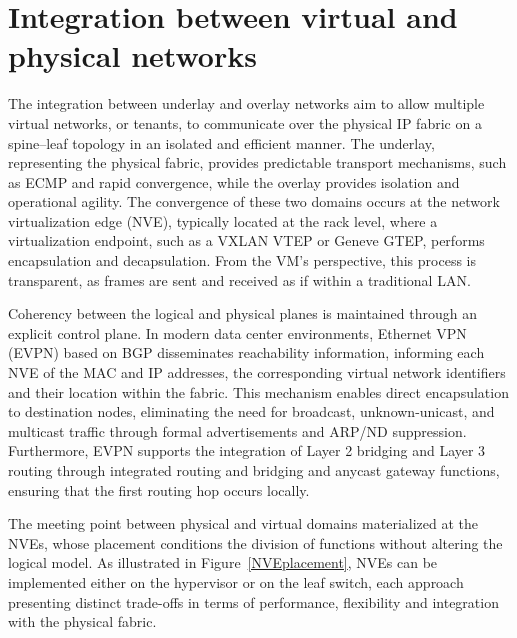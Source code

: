 \section{Integration between virtual and physical networks}

The integration between underlay and overlay networks aim to allow multiple virtual networks, or tenants, to communicate over the physical IP fabric on a spine–leaf topology in an isolated and efficient manner. The underlay, representing the physical fabric, provides predictable transport mechanisms, such as ECMP and rapid convergence, while the overlay provides isolation and operational agility. The convergence of these two domains occurs at the network virtualization edge (NVE), typically located at the rack level, where a virtualization endpoint, such as a VXLAN VTEP or Geneve GTEP, performs encapsulation and decapsulation. From the VM's perspective, this process is transparent, as frames are sent and received as if within a traditional LAN.

Coherency between the logical and physical planes is maintained through an explicit control plane. In modern data center environments, Ethernet VPN (EVPN) based on BGP disseminates reachability information, informing each NVE of the MAC and IP addresses, the corresponding virtual network identifiers and their location within the fabric. This mechanism enables direct encapsulation to destination nodes, eliminating the need for broadcast, unknown-unicast, and multicast traffic through formal advertisements and ARP/ND suppression. Furthermore, EVPN supports the integration of Layer 2 bridging and Layer 3 routing through integrated routing and bridging and anycast gateway functions, ensuring that the first routing hop occurs locally.

The meeting point between physical and virtual domains materialized at the NVEs, whose placement conditions the division of functions without altering the logical model. As illustrated in Figure~\ref{NVEplacement}, NVEs can be implemented either on the hypervisor or on the leaf switch, each approach presenting distinct trade-offs in terms of performance, flexibility and integration with the physical fabric. 

